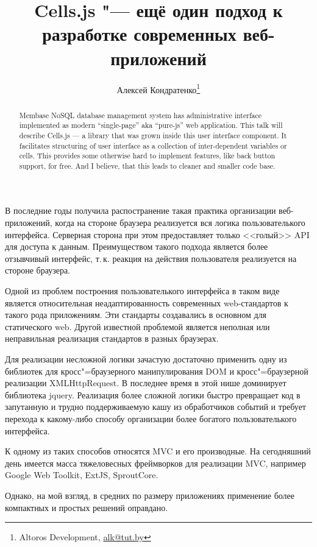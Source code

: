 \documentclass[10pt, a5paper]{article}
\begin{document}
\title{Cells.js "--- ещё один подход к разработке современных веб-приложений}

\author{Алексей Кондратенко\footnote{Altoros Development, \url{alk@tut.by}}}
\maketitle

\begin{abstract}
Membase NoSQL database management system has admi\-ni\-stra\-tive interface 
implemented as modern ``single-page'' aka ``pure-js'' web application. 
This talk will describe Cells.js --- a library that was grown inside 
this user interface component. It facilitates structuring of user 
interface as a collection of inter-dependent variables or cells. This 
provides some otherwise hard to implement features, like back button 
support, for free. And I believe, that this leads to cleaner and smaller 
code base.
\end{abstract}

В последние годы получила распостранение такая практика организации
веб-приложений, когда на стороне браузера реализуется вся логика
пользователького интерфейса. Серверная сторона при этом предоставляет
только <<голый>> API для доступа к данным. Преимуществом такого подхода
является более отзывчивый интерфейс, т.\,к. реакция на действия
пользователя реализуется на стороне браузера.

Одной из проблем построения пользователького интерфейса в таком виде
является относительная неадаптированность современных web-стандартов
к такого рода приложениям. Эти стандарты создавались в основном для
статического web. Другой известной проблемой является неполная или
неправильная реализация стандартов в разных браузерах.

Для реализации несложной логики зачастую достаточно применить одну из
библиотек для кросс"=браузерного манипулирования DOM и кросс"=браузерной
реализации XMLHttpRequest. В последнее время в этой нише доминирует
библиотека jquery. Реализация более сложной логики быстро превращает
код в запутанную и трудно поддерживаемую кашу из обработчиков событий и 
требует перехода к какому-либо способу организации более богатого
пользователького интерфейса.

К одному из таких способов относятся MVC и его производные. На
сегодняшний день имеется масса тяжеловесных фреймворков для
реализации MVC, например Google Web Toolkit, ExtJS, SproutCore.

Однако, на мой взгляд, в средних по размеру приложениях применение более
компактных и простых решений оправдано.
\end{document}
